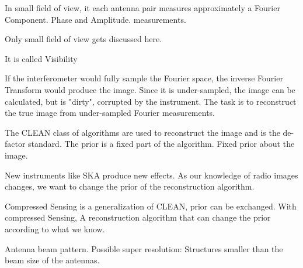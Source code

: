 In small field of view, it each antenna pair measures approximately a Fourier Component. Phase and Amplitude. measurements. 

Only small field of view gets discussed here.

It is called Visibility

If the interferometer would fully sample the Fourier space, the inverse Fourier Transform would produce the image. Since it is under-sampled, the image can be calculated, but is "dirty", corrupted by the instrument. The task is to reconstruct the true image from under-sampled Fourier measurements.


The CLEAN class of algorithms\cite{hogbom1974aperture}\cite{schwab1984relaxing}\cite{rich2008multi}\cite{rau2011multi} are used to reconstruct the image and is the de-factor standard. The prior is a fixed part of the algorithm. Fixed prior about the image.

New instruments like SKA produce new effects. As our knowledge of radio images changes, we want to change the prior of the reconstruction algorithm.

Compressed Sensing is a generalization of CLEAN, prior can be exchanged.
With compressed Sensing, A reconstruction algorithm that can change the prior according to what we know.

Antenna beam pattern. Possible super resolution: Structures smaller than the beam size of the antennas.



  




